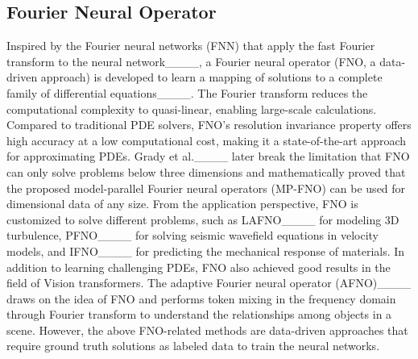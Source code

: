 \subsection{Fourier Neural Operator}
Inspired by the Fourier neural networks (FNN) that apply the fast Fourier transform to the neural network____, a Fourier neural operator (FNO, a data-driven approach) is developed to learn a mapping of solutions to a complete family of differential equations____. 
The Fourier transform reduces the computational complexity to quasi-linear, enabling large-scale calculations. 
Compared to traditional PDE solvers, FNO's resolution invariance property offers high accuracy at a low computational cost, making it a state-of-the-art approach for approximating PDEs.
Grady et al.____ later break the limitation that FNO can only solve problems below three dimensions and mathematically proved that the proposed model-parallel Fourier neural operators (MP-FNO) can be used for dimensional data of any size. 
From the application perspective, FNO is customized to solve different problems, such as LAFNO____ for modeling 3D turbulence, PFNO____ for solving seismic wavefield equations in velocity models, and IFNO____ for predicting the mechanical response of materials.
In addition to learning challenging PDEs, FNO also achieved good results in the field of Vision transformers. The adaptive Fourier neural operator (AFNO)____ draws on the idea of FNO and performs token mixing in the frequency domain through Fourier transform to understand the relationships among objects in a scene.
However, the above FNO-related methods are data-driven approaches that require ground truth solutions as labeled data to train the neural networks.